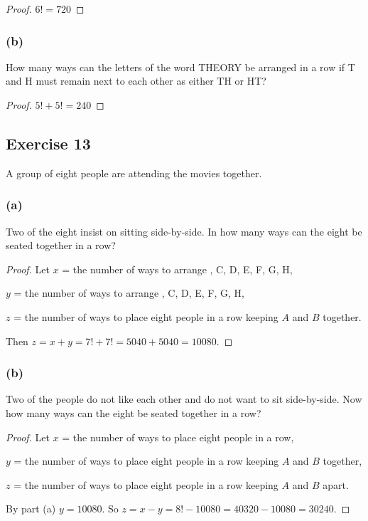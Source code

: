 \documentclass[14pt]{extarticle}
\begin{document}
\begin{proof}
\(6! = 720\)
\end{proof}

\subsubsection{(b)}
How many ways can the letters of the word THEORY be arranged in a row if T and H must remain next to each other 
as either TH or HT?

\begin{proof}
\(5! + 5! = 240\)
\end{proof}

\subsection{Exercise 13}
A group of eight people are attending the movies together.

\subsubsection{(a)}
Two of the eight insist on sitting side-by-side. In how many ways can the eight be seated together in a row?

\begin{proof}
Let $x$ = the number of ways to arrange , C, D, E, F, G, H,

$y$ = the number of ways to arrange , C, D, E, F, G, H,

$z$ = the number of ways to place eight people in a row keeping $A$ and $B$ together.

Then \(z = x+y = 7!+7! = 5040+5040 = 10080\).
\end{proof}

\subsubsection{(b)}
Two of the people do not like each other and do not want to sit side-by-side. Now how many ways can the eight be seated 
together in a row?

\begin{proof}
Let $x$ = the number of ways to place eight people in a row,

$y$ = the number of ways to place eight people in a row keeping $A$ and $B$ together,

$z$ = the number of ways to place eight people in a row keeping $A$ and $B$ apart.

By part (a) $y = 10080$. So \(z = x-y = 8!-10080 = 40320-10080 = 30240\).
\end{proof}
\end{document}
